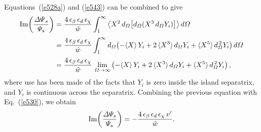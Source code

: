 \documentclass[12pt,prb,aps]{revtex4-1}
\begin{document}
Equations~(\ref{e528a}) and (\ref{e543}) can be combined to give\,\cite{fw,fw1}
\begin{align}
{\rm Im}\!\left(\frac{{\mit\Delta\Psi}_s}{{\mit\Psi}_s}\right) &=\frac{4\,\epsilon_\beta\,\epsilon_d\,\epsilon_\chi}{\hat{w}}\int_1^\infty
\left\langle X^{2}\,d_{\mit\Omega}\!\left[d_{\mit\Omega}(X^3\,d_{\mit\Omega}Y_i)\right]\right\rangle d{\mit\Omega}\nonumber\\[0.5ex]
&=\frac{4\,\epsilon_\beta\,\epsilon_d\,\epsilon_\chi}{\hat{w}}\int_1^\infty d_{\mit\Omega}\!\left(-\langle X\rangle\,Y_i
+2\,\langle X^3\rangle\,d_{\mit\Omega} Y_i + \langle X^5\rangle\,d_{\mit\Omega}^{\,2} Y_i\right)d{\mit\Omega}\nonumber\\[0.5ex]
&= \frac{4\,\epsilon_\beta\,\epsilon_d\,\epsilon_\chi}{\hat{w}}\,\lim_{\mit\Omega\rightarrow\infty}\left(-\langle X\rangle\,Y_i
+2\,\langle X^3\rangle\,d_{\mit\Omega} Y_i + \langle X^5\rangle\,d_{\mit\Omega}^{\,2} Y_i\right),
\end{align}
where use has been made of the facts that $Y_i$ is zero inside the island separatrix, and $Y_i$ is continuous across the separatrix.
Combining the previous equation with Eq.~(\ref{e530}), we obtain\,\cite{fw}
\begin{equation}\label{e545}
{\rm Im}\!\left(\frac{{\mit\Delta}{\mit\Psi}_s}{{\mit\Psi}_s}\right)  =- \frac{4\,\epsilon_\beta\,\epsilon_d\,\epsilon_\chi\,v'}{\hat{w}}.
\end{equation}
\end{document}
